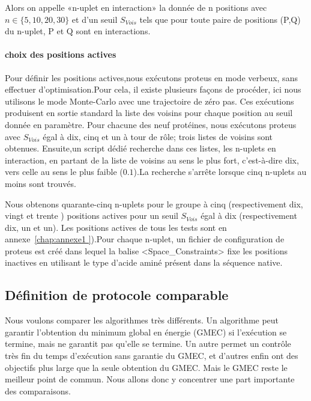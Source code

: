 Alors on appelle «n-uplet en interaction» la donnée de n positions avec $n \in \{5,10,20,30\}$ et d'un seuil  $S_{Vois}$  tels que pour toute paire de positions (P,Q) du n-uplet, P et Q sont en interactions.
\paragraph{choix des  positions actives}
Pour définir les positions actives,nous exécutons proteus en mode verbeux, sans effectuer d'optimisation.Pour cela,
il existe plusieurs façons de procéder, ici nous utilisons le mode Monte-Carlo avec une trajectoire de zéro pas. Ces exécutions produisent en sortie standard la liste des voisins pour chaque position au seuil donnée en paramètre.
Pour chacune des neuf protéines, nous exécutons proteus avec $S_{Vois}$ égal à dix, cinq et un à tour de rôle; trois listes de voisins sont obtenues. 
Ensuite,un script dédié recherche dans ces listes, les n-uplets en interaction, en partant de la liste de voisins au sens le plus fort, c'est-à-dire dix, vers celle  au sens le plus faible ($0.1$).La recherche s'arrête lorsque cinq n-uplets au moins sont trouvés.

Nous obtenons quarante-cinq n-uplets pour le groupe à cinq (respectivement dix, vingt et trente ) positions actives pour un seuil $S_{Vois}$ égal à dix (respectivement dix, un et un). Les positions actives de tous les tests sont en annexe~\ref{chap:annexe1 }).Pour chaque n-uplet, un fichier de configuration de proteus est créé dans lequel la balise <Space\_Constraints> fixe les positions inactives en utilisant le type d'acide aminé présent dans la séquence native. 


\subsection{Définition de protocole comparable}
\label{sec:proto_compa}
Nous voulons comparer les algorithmes très différents. Un algorithme peut garantir l'obtention du minimum global en énergie (GMEC) si l'exécution se termine, mais ne garantit pas qu'elle se termine. Un autre permet un contrôle très fin du temps d'exécution sans garantie du GMEC, et d'autres enfin ont des objectifs plus large que la seule obtention du GMEC.
Mais le GMEC reste le meilleur point de commun. Nous allons donc y concentrer une part importante des comparaisons.

